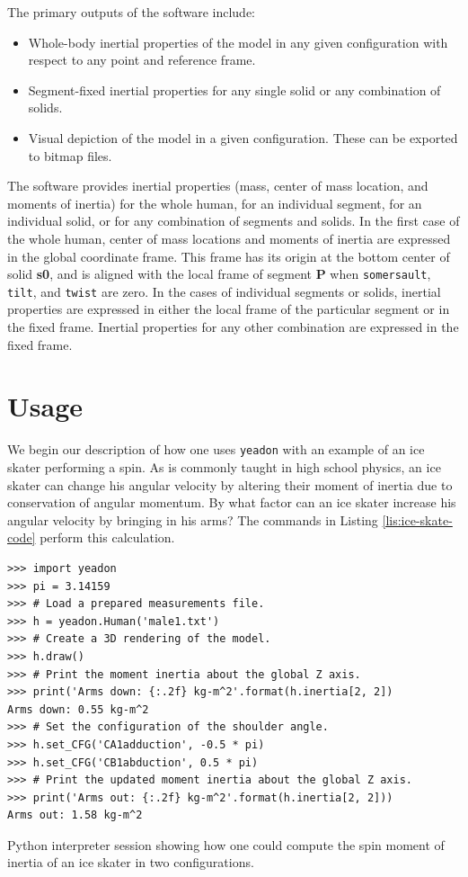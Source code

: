 \documentclass[10pt,a4paper,twocolumn]{article}
\begin{document}
The primary outputs of the software include:

\begin{itemize}
  \item Whole-body inertial properties of the model in any given configuration
    with respect to any point and reference frame.
  \item Segment-fixed inertial properties for any single solid or any
    combination of solids.
  \item Visual depiction of the model in a given configuration. These can be
    exported to bitmap files.
\end{itemize}

The software provides inertial properties (mass, center of mass location, and
moments of inertia) for the whole human, for an individual segment, for an
individual solid, or for any combination of segments and solids. In the first
case of the whole human, center of mass locations and moments of inertia are
expressed in the global coordinate frame. This frame has its origin at the
bottom center of solid \textbf{s0}, and is aligned with the local frame of
segment \textbf{P} when \verb+somersault+, \verb+tilt+, and \verb+twist+ are
zero. In the cases of individual segments or solids, inertial properties are
expressed in either the local frame of the particular segment or in the fixed
frame. Inertial properties for any other combination are expressed in the fixed
frame.

\section*{Usage}
\label{sec:usage}

We begin our description of how one uses \verb+yeadon+ with an example of an
ice skater performing a spin. As is commonly taught in high school physics, an
ice skater can change his angular velocity by altering their moment of inertia
due to conservation of angular momentum. By what factor can an ice skater
increase his angular velocity by bringing in his arms? The commands in Listing
\ref{lis:ice-skate-code} perform this calculation.

\begin{listing*}
  \begin{verbatim}
>>> import yeadon
>>> pi = 3.14159
>>> # Load a prepared measurements file.
>>> h = yeadon.Human('male1.txt')
>>> # Create a 3D rendering of the model.
>>> h.draw()
>>> # Print the moment inertia about the global Z axis.
>>> print('Arms down: {:.2f} kg-m^2'.format(h.inertia[2, 2])
Arms down: 0.55 kg-m^2
>>> # Set the configuration of the shoulder angle.
>>> h.set_CFG('CA1adduction', -0.5 * pi)
>>> h.set_CFG('CB1abduction', 0.5 * pi)
>>> # Print the updated moment inertia about the global Z axis.
>>> print('Arms out: {:.2f} kg-m^2'.format(h.inertia[2, 2]))
Arms out: 1.58 kg-m^2
  \end{verbatim}
  \caption{Python interpreter session showing how one could compute the spin
    moment of inertia of an ice skater in two configurations.}
  \label{lis:ice-skate-code}
\end{listing*}
\end{document}
